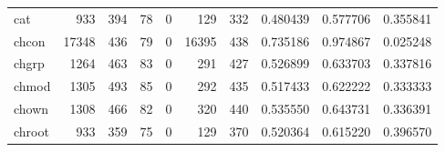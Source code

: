 \begin{longtable}{lrrrrrrrrr}
cat       &                                 933 &                                             394 &                                             78 &                                             0 &                                            129 &                                          332 &                                           0.480439 &                               0.577706 &                             0.355841 \\
chcon     &                               17348 &                                             436 &                                             79 &                                             0 &                                          16395 &                                          438 &                                           0.735186 &                               0.974867 &                             0.025248 \\
chgrp     &                                1264 &                                             463 &                                             83 &                                             0 &                                            291 &                                          427 &                                           0.526899 &                               0.633703 &                             0.337816 \\
chmod     &                                1305 &                                             493 &                                             85 &                                             0 &                                            292 &                                          435 &                                           0.517433 &                               0.622222 &                             0.333333 \\
chown     &                                1308 &                                             466 &                                             82 &                                             0 &                                            320 &                                          440 &                                           0.535550 &                               0.643731 &                             0.336391 \\
chroot    &                                 933 &                                             359 &                                             75 &                                             0 &                                            129 &                                          370 &                                           0.520364 &                               0.615220 &                             0.396570 \\

\end{longtable}
